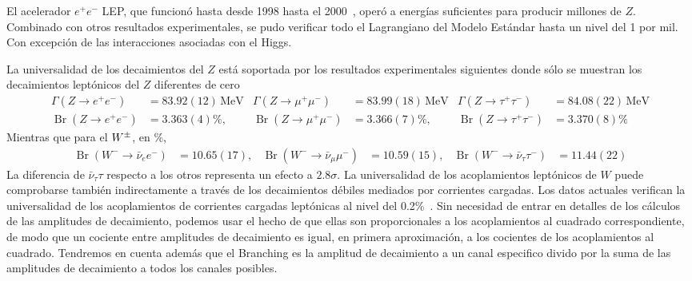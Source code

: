 El acelerador $e^+e^-$ LEP, que funcionó hasta desde 1998 hasta el 2000~\cite{LEP}, operó a energías suficientes para producir millones de $Z$. Combinado con otros resultados experimentales, se pudo verificar todo el Lagrangiano del Modelo Estándar hasta un nivel del 1 por mil. Con excepción de las interacciones asociadas con el Higgs. 

La universalidad de los decaimientos del $Z$ está soportada por los resultados experimentales siguientes donde sólo se muestran los decaimientos leptónicos del $Z$ diferentes de cero \cite{a} 
\begin{align}
  \label{eq:232qft}
  \Gamma(Z\to e^+e^-)&=83.92(12)\,\text{MeV} &\Gamma(Z\to\mu^+\mu^-)&=83.99(18)\,\text{MeV} 
  &\Gamma(Z\to\tau^+\tau^-)&=84.08(22)\,\text{MeV} \nonumber\\
  \operatorname{Br}(Z\to e^+e^-)&=3.363(4)\%, &\operatorname{Br}(Z\to\mu^+\mu^-)&=3.366(7)\%,  &
  \operatorname{Br}(Z\to\tau^+\tau^-)&=3.370(8)\% 
\end{align}
Mientras que para el $W^\pm$, en \%,
\begin{align}
\label{eq:231qft}
  \operatorname{Br}(W^-\to\bar{\nu}_e e^-)&=10.65(17), &
\operatorname{Br}(W^-\to\bar{\nu}_\mu \mu^-)&=10.59(15), &
\operatorname{Br}(W^-\to\bar{\nu}_\tau \tau^-)&=11.44(22) 
\end{align}
La diferencia de $\bar{\nu}_\tau \tau$ respecto a los otros representa un efecto a $2.8\sigma$. La universalidad de los acoplamientos leptónicos de $W$ puede comprobarse también indirectamente a través de los decaimientos débiles mediados por corrientes cargadas. Los datos actuales verifican la universalidad de los acoplamientos de corrientes cargadas leptónicas al nivel del 0.2\%~\cite{a}. Sin necesidad de entrar en detalles de los cálculos de las amplitudes de decaimiento, podemos usar el hecho de que ellas son proporcionales a los acoplamientos al cuadrado correspondiente, de modo que  un cociente entre amplitudes de decaimiento es igual, en primera aproximación, a los cocientes de los acoplamientos al cuadrado. Tendremos en cuenta además que el Branching es la amplitud de decaimiento a un canal especifico divido por la suma de las amplitudes de decaimiento a todos los canales posibles.




